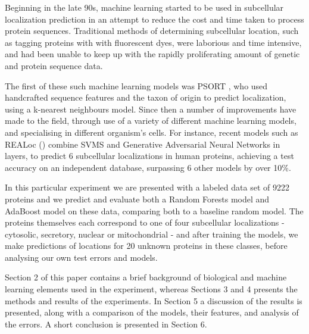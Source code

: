 \documentclass{bioinfo}
\begin{document}
Beginning in the late 90s, machine learning started to be used in subcellular localization prediction in an attempt to reduce the cost and time taken to process protein sequences.  
Traditional methods of determining subcellular location, such as tagging proteins with with fluorescent dyes, were laborious and time intensive, and had been unable to keep up with the rapidly proliferating amount of genetic and protein sequence data. 

The first of these such machine learning models was PSORT \cite{Nakai}, who used handcrafted sequence features and the taxon of origin to predict localization, using a k-nearest neighbours model.  Since then a number of improvements have made to the field, through use of a variety of different machine learning models, and specialising in different organism's cells. For instance, recent models such as REALoc (\cite{Tung}) combine SVMS and Generative Adversarial Neural Networks in layers, to predict 6 subcellular localizations in human proteins, achieving a test accuracy on an independent database, surpassing 6 other models by over 10\%.



In this particular experiment we are presented with a labeled data set of 9222 proteins and we predict and evaluate both a Random Forests model and AdaBoost model on these data, comparing both to a baseline random model.
The proteins themselves each correspond to one of four subcellular localizations - cytosolic, secretory, nuclear or mitochondrial - and after training the models, we make predictions of locations for 20 unknown proteins in these classes, before analysing our own test errors and models. 

Section 2 of this paper contains a brief background of biological and machine learning elements used in the experiment, whereas Sections 3 and 4 presents the methods and results of the experiments. In Section 5 a discussion of the results is presented, along with a comparison of the models, their features, and analysis of the errors. A short conclusion is presented in Section 6.
\end{document}
